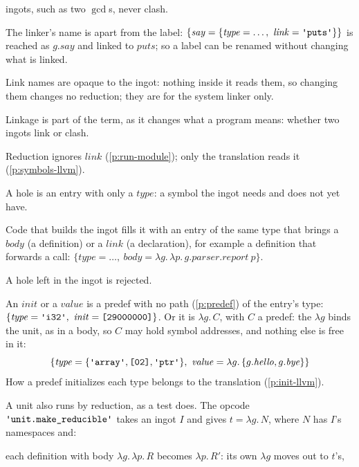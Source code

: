 \documentclass[11pt,letterpaper]{article}
\newcommand{\lam}[2]{\lambda #1.\,#2}       %
\newcommand{\str}[1]{\text{\ttfamily\textquotesingle #1\textquotesingle}}  %
\newcommand{\hex}[1]{\text{\ttfamily [#1]}}  %
\newcounter{pt}
\newcommand{\pref}[1]{\ref{#1}}  %
\begin{document}
\begin{points}
\begin{subpoints}
    ingots, such as two $\gcd$s, never clash.
  \item The linker's name is apart from the label: $\{\mathit{say} = \{\mathit{type} = \dots,\ \mathit{link} = \str{puts}\}\}$ is
    reached as $g.\mathit{say}$ and linked to $\mathit{puts}$; so a label can be renamed without changing what is linked.
  \item Link names are opaque to the ingot: nothing inside it reads them, so changing them changes no
    reduction; they are for the system linker only.
  \item Linkage is part of the term, as it changes what a program means: whether two ingots link or clash.
  \item Reduction ignores $\mathit{link}$ (\pref{p:run-module}); only the translation reads it (\pref{p:symbols-llvm}).
  \end{subpoints}
\item\label{p:hole} A hole is an entry with only a $\mathit{type}$: a symbol the ingot needs and does not yet have.
  \begin{subpoints}
  \item Code that builds the ingot fills it with an entry of the same type that brings a $\mathit{body}$ (a
    definition) or a $\mathit{link}$ (a declaration), for example a definition that forwards a call:
    $\{\mathit{type} = \dots,\ \mathit{body} = \lam{g}{\lam{p}{g.\mathit{parser}.\mathit{report}\ p}}\}$.
  \item A hole left in the ingot is rejected.
  \end{subpoints}
\item\label{p:init} An $\mathit{init}$ or a $\mathit{value}$ is a predef with no path (\pref{p:predef}) of the entry's type:
  $\{\mathit{type} = \str{i32},\ \mathit{init} = \hex{29000000}\}$.
  Or it is $\lam{g}{C}$, with $C$ a predef: the $\lambda g$ binds the unit, as in a body, so $C$ may hold symbol
  addresses, and nothing else is free in it:
  \[\{\mathit{type} = \{\str{array}, \hex{02}, \str{ptr}\},\ \mathit{value} = \lam{g}{\{g.\mathit{hello}, g.\mathit{bye}\}}\}\]
How a predef initializes each type belongs to the translation (\pref{p:init-llvm}).
\item\label{p:run-module} A unit also runs by reduction, as a test does. The opcode $\str{unit.make\_reducible}$ takes an ingot $I$ and gives
  $t = \lam{g}{N}$, where $N$ has $I$'s namespaces and:
  \begin{subpoints}
  \item each definition with body $\lam{g}{\lam{p}{R}}$ becomes $\lam{p}{R'}$: its own $\lambda g$ moves out to $t$'s,

\end{subpoints}
\end{points}
\end{document}
